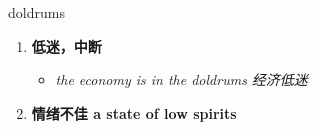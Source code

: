 
\begin{frame}
{\huge doldrums}
\begin{center}
\begin{enumerate}\Large
  \item \textbf{低迷，中断}
  \begin{itemize}
    \item \em{\Large{the economy is in the doldrums 经济低迷}}
  \end{itemize}
  \item \textbf{情绪不佳 a state of low spirits}
\end{enumerate}
\end{center}
\end{frame}
